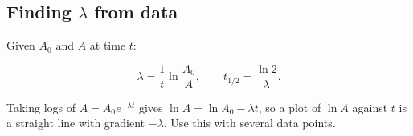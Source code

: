 \documentclass[11pt]{article}
\begin{document}
\subsection*{Finding $\lambda$ from data}

Given $A_{0}$ and $A$ at time $t$:

\[
\lambda = \frac{1}{t} \ln\frac{A_{0}}{A}, \qquad t_{1/2} = \frac{\ln 2}{\lambda}.
\]

Taking logs of $A = A_{0} e^{-\lambda t}$ gives $\ln A = \ln A_{0} - \lambda t$, so a plot of $\ln A$ against $t$ is a straight line with gradient $-\lambda$. Use this with several data points.
\end{document}

